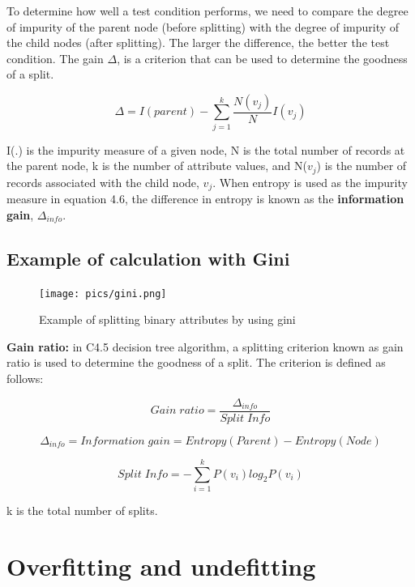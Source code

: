 		To determine how well a test condition performs, we need to compare the 
		degree of impurity of the parent node (before splitting) with the degree
		of impurity of the child nodes (after splitting). The larger the difference,
		the better the test condition. The gain $\Delta$, is a criterion that can 
		be used to determine the goodness of a split. 

			\begin{equation}
				\Delta = I(parent) - \sum_{j=1}^{k} \frac{N(v_{j})}{N}I(v_{j})
			\end{equation}

		I(.) is the impurity measure of a given node, N is the total number
		of records at the parent node, k is the number of attribute values, 
		and N($v_{j}$) is the number of records associated with the child node, $v_{j}$.
		When entropy is used as the impurity measure in equation 4.6, the difference
		in entropy is known as the {\bf information gain}, $\Delta_{info}$.

		\subsection*{Example of calculation with Gini}
		\begin{figure}[H]
			\centering
			\texttt{[image: pics/gini.png]}
			\caption{Example of splitting binary attributes by using gini}
		\end{figure}

		{\bf Gain ratio:} in C4.5 decision tree algorithm, a splitting criterion known
		as gain ratio is used to determine the goodness of a split. The criterion is
		defined as follows:

		\begin{equation}
			Gain\;ratio = \frac{\Delta_{info}}{Split\;Info}
		\end{equation}

		\begin{equation}
			\Delta_{info} = Information\;gain = Entropy(Parent) - Entropy(Node)
		\end{equation}

		\begin{equation}
			Split\;Info = - \sum_{i=1}^{k} P(v_{i})log_{2}P(v_{i})
		\end{equation}

		k is the total number of splits.

		\clearpage
		\section{Overfitting and undefitting}

